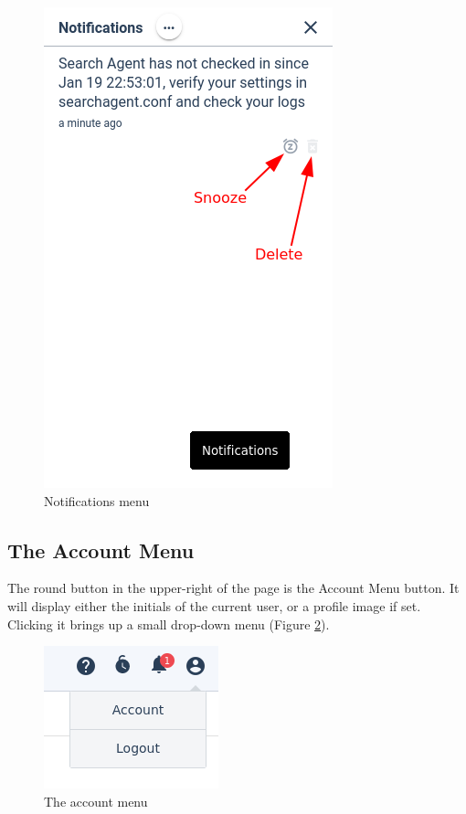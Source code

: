 \begin{figure}
	\includegraphics{images/notification-menu.png}
	\caption{Notifications menu}
	\label{fig:notification-menu}
\end{figure}

\clearpage
\subsection{The Account Menu}
\label{sec:account-menu}

The round button in the upper-right of the page is the Account Menu button. It will display either the initials of the current user, or a profile image if set. Clicking it brings up a small drop-down menu (Figure \ref{fig:accountmenu}).

\begin{figure}
	\includegraphics{images/user-dropdown.png}
	\caption{The account menu}
	\label{fig:accountmenu}
\end{figure}

